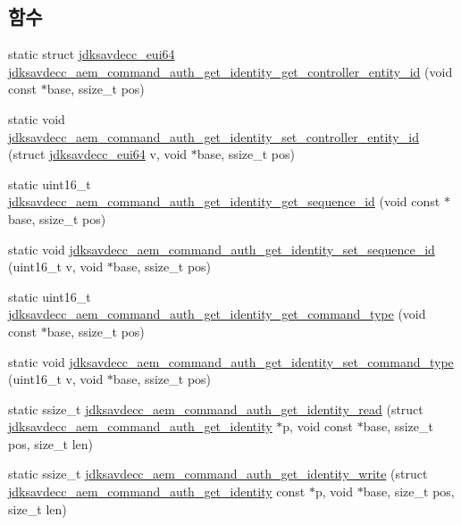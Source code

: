 \subsection*{함수}
\begin{DoxyCompactItemize}
\item 
static struct \hyperlink{structjdksavdecc__eui64}{jdksavdecc\+\_\+eui64} \hyperlink{group__command__auth__get__identity_gaff37d81d6d32332491ee8dccf5814ba6}{jdksavdecc\+\_\+aem\+\_\+command\+\_\+auth\+\_\+get\+\_\+identity\+\_\+get\+\_\+controller\+\_\+entity\+\_\+id} (void const $\ast$base, ssize\+\_\+t pos)
\item 
static void \hyperlink{group__command__auth__get__identity_ga7fed924d3980f6ec001fdff0fdafa52d}{jdksavdecc\+\_\+aem\+\_\+command\+\_\+auth\+\_\+get\+\_\+identity\+\_\+set\+\_\+controller\+\_\+entity\+\_\+id} (struct \hyperlink{structjdksavdecc__eui64}{jdksavdecc\+\_\+eui64} v, void $\ast$base, ssize\+\_\+t pos)
\item 
static uint16\+\_\+t \hyperlink{group__command__auth__get__identity_gae3df0c0ff13e69ca091b8459a051238b}{jdksavdecc\+\_\+aem\+\_\+command\+\_\+auth\+\_\+get\+\_\+identity\+\_\+get\+\_\+sequence\+\_\+id} (void const $\ast$base, ssize\+\_\+t pos)
\item 
static void \hyperlink{group__command__auth__get__identity_gadb6c292d850e0d6b41c73e0dc273d6c9}{jdksavdecc\+\_\+aem\+\_\+command\+\_\+auth\+\_\+get\+\_\+identity\+\_\+set\+\_\+sequence\+\_\+id} (uint16\+\_\+t v, void $\ast$base, ssize\+\_\+t pos)
\item 
static uint16\+\_\+t \hyperlink{group__command__auth__get__identity_ga5b3ae6c2961896719f7fcc98729a6a6e}{jdksavdecc\+\_\+aem\+\_\+command\+\_\+auth\+\_\+get\+\_\+identity\+\_\+get\+\_\+command\+\_\+type} (void const $\ast$base, ssize\+\_\+t pos)
\item 
static void \hyperlink{group__command__auth__get__identity_ga3ab2153474e513c1e83a9a9db081d711}{jdksavdecc\+\_\+aem\+\_\+command\+\_\+auth\+\_\+get\+\_\+identity\+\_\+set\+\_\+command\+\_\+type} (uint16\+\_\+t v, void $\ast$base, ssize\+\_\+t pos)
\item 
static ssize\+\_\+t \hyperlink{group__command__auth__get__identity_ga68e9aa18961717c072d7f3c92a72297a}{jdksavdecc\+\_\+aem\+\_\+command\+\_\+auth\+\_\+get\+\_\+identity\+\_\+read} (struct \hyperlink{structjdksavdecc__aem__command__auth__get__identity}{jdksavdecc\+\_\+aem\+\_\+command\+\_\+auth\+\_\+get\+\_\+identity} $\ast$p, void const $\ast$base, ssize\+\_\+t pos, size\+\_\+t len)
\item 
static ssize\+\_\+t \hyperlink{group__command__auth__get__identity_ga2585f359eda0bcee01271c8219eb93ec}{jdksavdecc\+\_\+aem\+\_\+command\+\_\+auth\+\_\+get\+\_\+identity\+\_\+write} (struct \hyperlink{structjdksavdecc__aem__command__auth__get__identity}{jdksavdecc\+\_\+aem\+\_\+command\+\_\+auth\+\_\+get\+\_\+identity} const $\ast$p, void $\ast$base, size\+\_\+t pos, size\+\_\+t len)
\end{DoxyCompactItemize}


